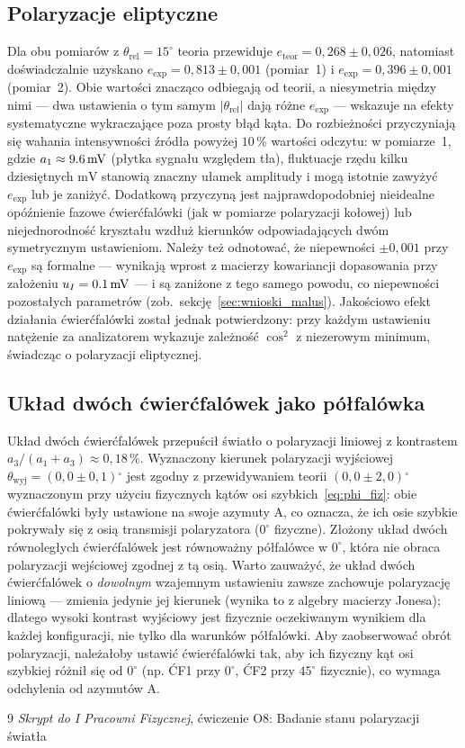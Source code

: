 \documentclass[12pt, a4paper]{article}
\begin{document}
\subsection{Polaryzacje eliptyczne}

Dla obu pomiarów z $\theta_\text{rel} = 15^{\circ}$ teoria przewiduje
$e_\text{teor} = 0{,}268 \pm 0{,}026$, natomiast doświadczalnie uzyskano
$e_\text{exp} = 0{,}813 \pm 0{,}001$ (pomiar~1) i $e_\text{exp} = 0{,}396 \pm 0{,}001$
(pomiar~2). Obie wartości znacząco odbiegają od teorii, a niesymetria między nimi
--- dwa ustawienia o tym samym $|\theta_\text{rel}|$ dają różne $e_\text{exp}$ ---
wskazuje na efekty systematyczne wykraczające poza prosty błąd kąta.
Do rozbieżności przyczyniają się wahania intensywności źródła powyżej $10\,\%$
wartości odczytu: w pomiarze~1, gdzie $a_1 \approx \SI{9{,}6}{mV}$ (płytka sygnału
względem tła), fluktuacje rzędu kilku dziesiętnych $\text{mV}$ stanowią znaczny
ułamek amplitudy i mogą istotnie zawyżyć $e_\text{exp}$ lub je zaniżyć.
Dodatkową przyczyną jest najprawdopodobniej nieidealne opóźnienie fazowe ćwierćfalówki
(jak w pomiarze polaryzacji kołowej) lub niejednorodność kryształu wzdłuż kierunków
odpowiadających dwóm symetrycznym ustawieniom.
Należy też odnotować, że niepewności $\pm 0{,}001$ przy $e_\text{exp}$ są formalne
--- wynikają wprost z macierzy kowariancji dopasowania przy założeniu $u_I = \SI{0{,}1}{mV}$
--- i są zaniżone z tego samego powodu, co niepewności pozostałych parametrów
(zob.~sekcję~\ref{sec:wnioski_malus}).
Jakościowo efekt działania ćwierćfalówki został jednak potwierdzony: przy każdym
ustawieniu natężenie za analizatorem wykazuje zależność $\cos^2$ z niezerowym
minimum, świadcząc o polaryzacji eliptycznej.

\subsection{Układ dwóch ćwierćfalówek jako półfalówka}

Układ dwóch ćwierćfalówek przepuścił światło o polaryzacji liniowej
z kontrastem $a_3/(a_1+a_3) \approx 0{,}18\,\%$.
Wyznaczony kierunek polaryzacji wyjściowej $\theta_\text{wyj} = (0{,}0 \pm 0{,}1){}^{\circ}$
jest zgodny z przewidywaniem teorii
$(0{,}0 \pm 2{,}0){}^{\circ}$
wyznaczonym przy użyciu fizycznych kątów osi szybkich~\eqref{eq:phi_fiz}:
obie ćwierćfalówki były ustawione na swoje azymuty A, co oznacza,
że ich osie szybkie pokrywały się z osią transmisji polaryzatora ($0^{\circ}$ fizyczne).
Złożony układ dwóch równoległych ćwierćfalówek jest równoważny półfalówce
w $0^{\circ}$, która nie obraca polaryzacji wejściowej zgodnej z tą osią.
Warto zauważyć, że układ dwóch ćwierćfalówek o \emph{dowolnym} wzajemnym ustawieniu
zawsze zachowuje polaryzację liniową --- zmienia jedynie jej kierunek (wynika to
z algebry macierzy Jonesa); dlatego wysoki kontrast wyjściowy jest fizycznie
oczekiwanym wynikiem dla każdej konfiguracji, nie tylko dla warunków półfalówki.
Aby zaobserwować obrót polaryzacji, należałoby ustawić ćwierćfalówki tak, aby ich
fizyczny kąt osi szybkiej różnił się od $0^{\circ}$ (np. ĆF1 przy $0^{\circ}$,
ĆF2 przy $45^{\circ}$ fizycznie), co wymaga odchylenia od azymutów A.

\begin{thebibliography}{9}
    \textit{Skrypt do I Pracowni Fizycznej}, ćwiczenie O8:
    Badanie stanu polaryzacji światła
\end{thebibliography}
\end{document}
